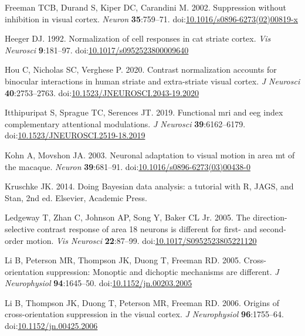 \documentclass[]{article}
\begin{document}
\leavevmode\hypertarget{ref-Freeman2002}{}%
Freeman TCB, Durand S, Kiper DC, Carandini M. 2002. Suppression without inhibition in visual cortex. \emph{Neuron} \textbf{35}:759--71. doi:\href{https://doi.org/10.1016/s0896-6273(02)00819-x}{10.1016/s0896-6273(02)00819-x}

\leavevmode\hypertarget{ref-Heeger1992}{}%
Heeger DJ. 1992. Normalization of cell responses in cat striate cortex. \emph{Vis Neurosci} \textbf{9}:181--97. doi:\href{https://doi.org/10.1017/s0952523800009640}{10.1017/s0952523800009640}

\leavevmode\hypertarget{ref-Hou2020}{}%
Hou C, Nicholas SC, Verghese P. 2020. Contrast normalization accounts for binocular interactions in human striate and extra-striate visual cortex. \emph{J Neurosci} \textbf{40}:2753--2763. doi:\href{https://doi.org/10.1523/JNEUROSCI.2043-19.2020}{10.1523/JNEUROSCI.2043-19.2020}

\leavevmode\hypertarget{ref-Itthipuripat2019}{}%
Itthipuripat S, Sprague TC, Serences JT. 2019. Functional mri and eeg index complementary attentional modulations. \emph{J Neurosci} \textbf{39}:6162--6179. doi:\href{https://doi.org/10.1523/JNEUROSCI.2519-18.2019}{10.1523/JNEUROSCI.2519-18.2019}

\leavevmode\hypertarget{ref-Kohn2003}{}%
Kohn A, Movshon JA. 2003. Neuronal adaptation to visual motion in area mt of the macaque. \emph{Neuron} \textbf{39}:681--91. doi:\href{https://doi.org/10.1016/s0896-6273(03)00438-0}{10.1016/s0896-6273(03)00438-0}

\leavevmode\hypertarget{ref-Kruschke2014}{}%
Kruschke JK. 2014. Doing Bayesian data analysis: a tutorial with R, JAGS, and Stan, 2nd ed. Elsevier, Academic Press.

\leavevmode\hypertarget{ref-Ledgeway2005}{}%
Ledgeway T, Zhan C, Johnson AP, Song Y, Baker CL Jr. 2005. The direction-selective contrast response of area 18 neurons is different for first- and second-order motion. \emph{Vis Neurosci} \textbf{22}:87--99. doi:\href{https://doi.org/10.1017/S0952523805221120}{10.1017/S0952523805221120}

\leavevmode\hypertarget{ref-Li2005}{}%
Li B, Peterson MR, Thompson JK, Duong T, Freeman RD. 2005. Cross-orientation suppression: Monoptic and dichoptic mechanisms are different. \emph{J Neurophysiol} \textbf{94}:1645--50. doi:\href{https://doi.org/10.1152/jn.00203.2005}{10.1152/jn.00203.2005}

\leavevmode\hypertarget{ref-Li2006}{}%
Li B, Thompson JK, Duong T, Peterson MR, Freeman RD. 2006. Origins of cross-orientation suppression in the visual cortex. \emph{J Neurophysiol} \textbf{96}:1755--64. doi:\href{https://doi.org/10.1152/jn.00425.2006}{10.1152/jn.00425.2006}
\end{document}
